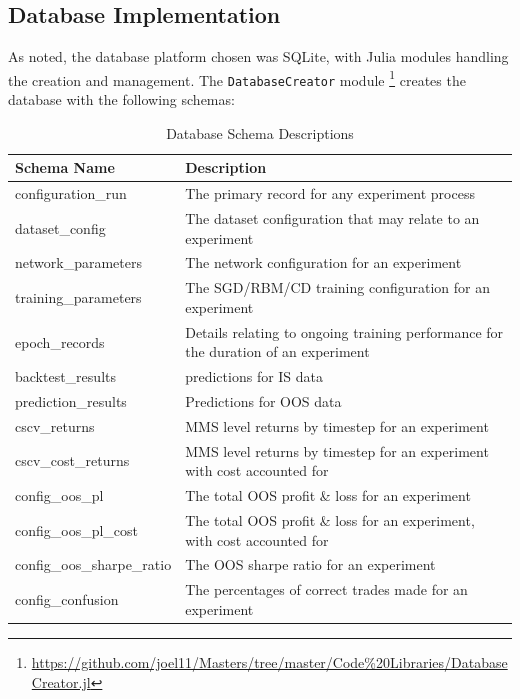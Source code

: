 \documentclass[a4paper,11pt,oneside]{article}
\theoremstyle{plain}
\theoremstyle{definition}
\begin{document}
\subsection{Database Implementation}

As noted, the database platform chosen was SQLite, with Julia modules handling the creation and management. The \texttt{DatabaseCreator} module \footnote{\url{https://github.com/joel11/Masters/tree/master/Code\%20Libraries/DatabaseCreator.jl}} creates the database with the following schemas:

\begin{table}[h]
	\begin{tabular}{|p{0.3\linewidth}|p{0.7\linewidth}|}
		\hline
		\textbf{Schema Name} &\textbf{Description}  \\\hline	
		{configuration\_run} & {The primary record for any experiment process} \\\hline
		{dataset\_config} & {The dataset configuration that may relate to an experiment} \\\hline
		{network\_parameters} & {The network configuration for an experiment} \\\hline
		{training\_parameters} & {The SGD/RBM/CD training configuration for an experiment}  \\\hline
		{epoch\_records} & {Details relating to ongoing training performance for the duration of an experiment}  \\\hline
		{backtest\_results} & {predictions for IS data}  \\\hline
		{prediction\_results} & {Predictions for OOS data}  \\\hline
		{cscv\_returns} & {MMS level returns by timestep for an experiment}  \\\hline
		{cscv\_cost\_returns} & {MMS level returns by timestep for an experiment with cost accounted for}  \\\hline
		{config\_oos\_pl} & {The total OOS profit \& loss for an experiment}  \\\hline
		{config\_oos\_pl\_cost} & {The total OOS profit \& loss for an experiment, with cost accounted for}  \\\hline
		{config\_oos\_sharpe\_ratio} & {The OOS sharpe ratio for an experiment}  \\\hline
		{config\_confusion} & {The percentages of correct trades made for an experiment}  \\\hline
	\end{tabular}
	\newline\newline
	\caption{Database Schema Descriptions}\label{tab_schemas}
\end{table}
\end{document}
